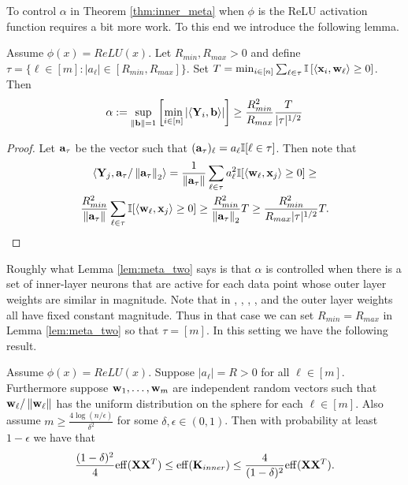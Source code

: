 To control $\alpha$ in Theorem \ref{thm:inner_meta} when $\phi$ is the ReLU activation function requires a bit more work.  To this end we introduce the following lemma. 
\begin{lemma}\label{lem:meta_two}
Assume $\phi(x) = ReLU(x)$.  Let $R_{min}, R_{max} > 0$ and define $\tau = \{\ell \in [m] : |a_\ell| \in [R_{min}, R_{max}] \}$.  Set $T = \min_{i \in [n]} \sum_{\ell \in \tau} \mathbb{I}\left[\langle \mathbf{x}_i, \mathbf{w}_\ell \rangle \geq 0\right]$.  Then
\[\alpha := \sup_{\left\lVert\mathbf b\right\rVert = 1} \left[\min_{i \in [n]} |\langle \mathbf{Y}_i, \mathbf b \rangle| \right] \geq \frac{R_{min}^2}{R_{max}} \frac{T}{|\tau|^{1/2}} \]
\end{lemma}
\begin{proof}
Let $\mathbf{a}_{\tau}$ be the vector such that $(\mathbf{a}_\tau)_\ell = a_\ell \mathbb{I}[\ell \in \tau]$.  Then note that
\begin{gather*}
\langle \mathbf{Y}_j, \mathbf{a}_\tau / \left\lVert\mathbf{a}_\tau\right\rVert_2 \rangle = \frac{1}{\left\lVert\mathbf{a}_\tau\right\rVert} \sum_{\ell \in \tau} a_\ell^2 \mathbb{I}[\langle \mathbf{w}_\ell, \mathbf{x}_j \rangle \geq 0] \geq \\ \frac{R_{min}^2}{\left\lVert\mathbf{a}_\tau\right\rVert} \sum_{\ell \in \tau} \mathbb{I}[\langle \mathbf{w}_\ell, \mathbf{x}_j \rangle \geq 0] \geq 
\frac{R_{min}^2}{\left\lVert\mathbf{a}_\tau\right\rVert_2} T \geq \frac{R_{min}^2}{R_{max} |\tau|^{1/2}} T.
\end{gather*}
\end{proof}
\par
Roughly what Lemma \ref{lem:meta_two} says is that $\alpha$ is controlled when there is a set of inner-layer neurons that are active for each data point whose outer layer weights are similar in magnitude.  Note that in \cite{du2018gradient}, \cite{fine_grain_arora}, \cite{DBLP:journals/corr/abs-1906-05392}, \cite{pmlr-v108-li20j}, \cite{pmlr-v54-xie17a} and \cite{solt_mod_over} the outer layer weights all have fixed constant magnitude.  Thus in that case we can set $R_{min} = R_{max}$ in Lemma \ref{lem:meta_two} so that $\tau = [m]$.  In this setting we have the following result.
\begin{theorem}\label{thm:const_outer_inner_bound}
Assume $\phi(x) = ReLU(x)$.  Suppose $|a_{\ell}| = R > 0$ for all $\ell \in [m]$.  Furthermore suppose $\mathbf{w}_1, \ldots, \mathbf{w}_m$ are independent random vectors such that $\mathbf{w}_\ell / \left\lVert\mathbf{w}_\ell\right\rVert$ has the uniform distribution on the sphere for each $\ell \in [m]$.  Also assume $m \geq \frac{4 \log(n / \epsilon)}{\delta^2}$ for some $\delta, \epsilon \in (0, 1)$. Then with probability at least $1 - \epsilon$ we have that
\[ \frac{(1 - \delta)^2}{4} \mathrm{eff}(\mathbf{X} \mathbf{X}^T) \leq \mathrm{eff}(\mathbf{K}_{inner}) \leq \frac{4}{(1 - \delta)^2} \mathrm{eff}(\mathbf{X} \mathbf{X}^T). \]
\end{theorem}
